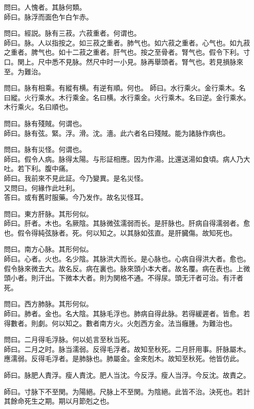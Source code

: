問曰。人愧者。其脉何類。\\
師曰。脉浮而面色乍白乍赤。

問曰。經説。脉有三菽。六菽重者。何谓也。\\
師曰。脉。人以指按之。如三菽之重者。肺气也。如六菽之重者。心气也。如九菽之重者。脾气也。如十二菽之重者。肝气也。按之至骨者。腎气也。假令下利。寸口。関上。尺中悉不見脉。然尺中时一小見。脉再舉頭者。腎气也。若見損脉來至。为難治。

問曰。脉有相乘。有縱有横。有逆有順。何也。
師曰。水行乘火。金行乘木。名曰縱。火行乘水。木行乘金。名曰横。水行乘金。火行乘木。名曰逆。金行乘水。木行乘火。名曰順也。

問曰。脉有殘賊。何谓也。\\
師曰。脉有弦。緊。浮。滑。沈。濇。此六者名曰殘賊。能为諸脉作病也。

問曰。脉有災怪。何谓也。\\
師曰。假令人病。脉得太陽。与形証相應。因为作湯。比還送湯如食頃。病人乃大吐。若下利。腹中痛。\\
師曰。我前來不見此証。今乃變異。是名災怪。\\
又問曰。何緣作此吐利。\\
答曰。或有舊时服藥。今乃发作。故名災怪耳。

問曰。東方肝脉。其形何似。\\
師曰。肝者。木也。名厥陰。其脉微弦濡弱而长。是肝脉也。肝病自得濡弱者。愈也。假令得純弦脉者。死。何以知之。以其脉如弦直。是肝臓傷。故知死也。

問曰。南方心脉。其形何似。\\
師曰。心者。火也。名少陰。其脉洪大而长。是心脉也。心病自得洪大者。愈也。假令脉來微去大。故名反。病在裏也。脉來頭小本大者。故名覆。病在表也。上微頭小者。則汗出。下微本大者。則为関格不通。不得尿。頭无汗者可治。有汗者死。

問曰。西方肺脉。其形何似。\\
師曰。肺者。金也。名大陰。其脉毛浮也。肺病自得此脉。若得緩遲者。皆愈。若得數者。則劇。何以知之。數者南方火。火剋西方金。法当癰腫。为難治也。

問曰。二月得毛浮脉。何以処言至秋当死。\\
師曰。二月之时。脉当濡弱。反得毛浮者。故知至秋死。二月肝用事。肝脉屬木。應濡弱。反得毛浮者。是肺脉也。肺屬金。金來剋木。故知至秋死。他皆仿此。

師曰。脉肥人責浮。瘦人責沈。肥人当沈。今反浮。瘦人当浮。今反沈。故責之。

師曰。寸脉下不至関。为陽絕。尺脉上不至関。为陰絕。此皆不治。決死也。若計其餘命死生之期。期以月節剋之也。

